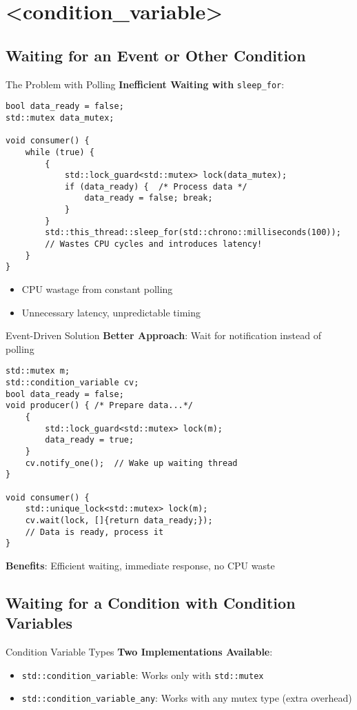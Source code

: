 \section{<condition\_variable>}

\subsection{Waiting for an Event or Other Condition}
\begin{frame}[fragile]{The Problem with Polling}
	\textbf{Inefficient Waiting with} \texttt{sleep\_for}:

	\begin{verbatim}
bool data_ready = false;
std::mutex data_mutex;

void consumer() {
    while (true) {
        {
            std::lock_guard<std::mutex> lock(data_mutex);
            if (data_ready) {  /* Process data */
                data_ready = false; break;
            }
        }
        std::this_thread::sleep_for(std::chrono::milliseconds(100));
        // Wastes CPU cycles and introduces latency!
    }
}
	\end{verbatim}

	\begin{itemize}
		\item CPU wastage from constant polling
		\item Unnecessary latency, unpredictable timing
	\end{itemize}
\end{frame}

\begin{frame}[fragile]{Event-Driven Solution}
	\textbf{Better Approach}: Wait for notification instead of polling

	\begin{verbatim}
std::mutex m;
std::condition_variable cv;
bool data_ready = false;
void producer() { /* Prepare data...*/
    {
        std::lock_guard<std::mutex> lock(m);
        data_ready = true;
    }
    cv.notify_one();  // Wake up waiting thread
}

void consumer() {
    std::unique_lock<std::mutex> lock(m);
    cv.wait(lock, []{return data_ready;});
    // Data is ready, process it
}
	\end{verbatim}

	\textbf{Benefits}: Efficient waiting, immediate response, no CPU waste
\end{frame}

\subsection{Waiting for a Condition with Condition Variables}
\begin{frame}[fragile]{Condition Variable Types}
	\textbf{Two Implementations Available}:

	\begin{itemize}
		\item \texttt{std::condition\_variable}: Works only with \texttt{std::mutex}
		\item \texttt{std::condition\_variable\_any}: Works with any mutex type (extra overhead)
	\end{itemize}
\end{frame}

